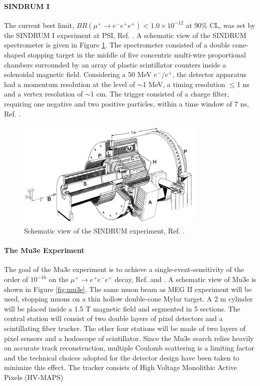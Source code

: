 \paragraph{SINDRUM I}
The current best limit, $BR(\mu^+ \rightarrow e^- e^+ e^+) < 1.0 \times 10^{- 12}$ at 90\% CL, was set by the
SINDRUM I experiment at PSI, Ref. \cite{sindrumi}. A schematic view of the SINDRUM spectrometer is given in Figure \ref{fig:sindrumi}. 
The spectrometer consisted of a double cone-shaped stopping target in the middle of five concentric multi-wire proportional chambers surrounded by an array of plastic
scintillator counters inside a solenoidal magnetic field. Considering a 50 MeV $e^-/e^+$, the detector 
apparatus had a momentum resolution at the level of $\sim$1 MeV,
a timing resolution $\leq$1 ns and a vertex resolution of $\sim$1 cm. 
The trigger consisted of a charge filter, requiring one negative and two 
positive particles, within a time window of 7 ns, Ref. \cite{universe8060299}.
\begin{figure}[!h]
\centering
\includegraphics[width =0.8\textwidth]{figures/png/The-SINDRUM-I-detector-in-the-horizontal-operating-orientation.png}
\caption[SINDRUM experiment.]{Schematic view of the SINDRUM experiment, Ref. \cite{sindrumi}.}
\label{fig:sindrumi}
\end{figure}

\paragraph{The Mu3e Experiment}
The goal of the Mu3e experiment is to achieve a single-event-sensitivity of the order
of $10^{-16}$ on the $\mu^+ \rightarrow e^+ e^-  e^+ $ decay, Ref. \cite{hesketh2022mu3e} and \cite{papa}. 
A schematic view of Mu3e is shown in Figure \ref{fig:mu3e}.
The same muon beam as MEG II experiment will be used, stopping muons on a thin hollow double-cone Mylar target. 
A 2 m cylinder will be placed inside a 1.5 T magnetic field and segmented in 5 sections. 
The central station will consist of two double layers of pixel detectors and a
scintillating fiber tracker. The other four stations will be made of two layers of pixel
sensors and a hodoscope of scintillator. Since the Mu3e search relies heavily on accurate track reconstruction, multiple Coulomb
scattering is a limiting factor and the technical choices adopted for the detector design
have been taken to minimize this effect. The tracker consists of High Voltage Monolithic Active Pixels (HV-MAPS)

